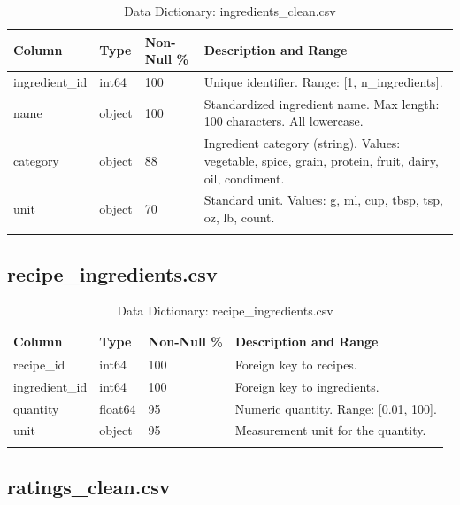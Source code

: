 \documentclass[11pt,a4paper]{article}
\begin{document}
\begin{longtable}{|p{2.5cm}|p{1.5cm}|p{2.5cm}|p{6.5cm}|}
    \hline
    \textbf{Column} & \textbf{Type} & \textbf{Non-Null \%} & \textbf{Description and Range} \\
    \hline
    \endhead
    
    ingredient\_id & int64 & 100 & Unique identifier. Range: [1, n\_ingredients]. \\
    \hline
    name & object & 100 & Standardized ingredient name. Max length: 100 characters. All lowercase. \\
    \hline
    category & object & 88 & Ingredient category (string). Values: vegetable, spice, grain, protein, fruit, dairy, oil, condiment. \\
    \hline
    unit & object & 70 & Standard unit. Values: g, ml, cup, tbsp, tsp, oz, lb, count. \\
    \hline
    
    \caption{Data Dictionary: ingredients\_clean.csv}
    \label{tab:dd_ingredients}
\end{longtable}

\subsection{recipe\_ingredients.csv}

\begin{longtable}{|p{2.5cm}|p{1.5cm}|p{2.5cm}|p{6.5cm}|}
    \hline
    \textbf{Column} & \textbf{Type} & \textbf{Non-Null \%} & \textbf{Description and Range} \\
    \hline
    \endhead
    
    recipe\_id & int64 & 100 & Foreign key to recipes. \\
    \hline
    ingredient\_id & int64 & 100 & Foreign key to ingredients. \\
    \hline
    quantity & float64 & 95 & Numeric quantity. Range: [0.01, 100]. \\
    \hline
    unit & object & 95 & Measurement unit for the quantity. \\
    \hline
    
    \caption{Data Dictionary: recipe\_ingredients.csv}
    \label{tab:dd_recipe_ingredients}
\end{longtable}

\subsection{ratings\_clean.csv}
\end{document}
